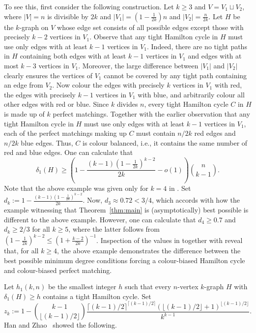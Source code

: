 \documentclass[A4paper,12pt]{article}
\theoremstyle{definition}
\begin{document}
To see this, first consider the following construction. 
Let $k \geq 3$ and $V = V_1 \sqcup V_2$, where $|V| = n$ is divisible by $2k$ and $|V_1| = (1 - \frac{1}{2k})n$ and $|V_2| = \frac{n}{2k}$.
Let $H$ be the $k$-graph on $V$ whose edge set consists of all possible edges except those with precisely $k-2$ vertices in $V_1$. 
Observe that any tight Hamilton cycle in $H$ must use only edges with at least $k-1$ vertices in $V_1$.
Indeed, there are no tight paths in $H$ containing both edges with at least $k-1$ vertices in $V_1$ and edges with at most $k-3$ vertices in $V_1$. 
Moreover, the large difference between $|V_1|$ and $|V_2|$ clearly ensures the vertices of $V_1$ cannot be covered by any tight path containing an edge from $V_2$. 
Now colour the edges with precisely $k$ vertices in $V_1$ with red, the edges with precisely $k-1$ vertices in $V_1$ with blue, and arbitrarily colour all other edges with red or blue. 
Since $k$ divides $n$, every tight Hamilton cycle $C$ in $H$ is made up of $k$ perfect matchings.
Together with the earlier observation that any tight Hamilton cycle in $H$ must use only edges with at least $k-1$ vertices in $V_1$, each of the perfect matchings making up $C$ must contain $n/2k$ red edges and $n/2k$ blue edges.
Thus, $C$ is colour balanced, i.e., it contains the same number of red and blue edges.
One can calculate that $$\delta_1(H) \geq \left(1 - \frac{(k-1)\left(1 - \frac{1}{2k}\right)^{k-2}}{2k} - o(1)\right)\binom{n}{k-1}.$$ 
Note that the above example was given only for $k=4$ in \cite{color-bias25}. Set $d_k := 1 - \frac{(k-1)\left(1 - \frac{1}{2k}\right)^{k-2}}{2k}$. 
Now, $d_3 \approx 0.72 < 3/4$, which accords with how the example witnessing that Theorem~\ref{thm:main} is (asymptotically) best possible is different to the above example.
However, one can calculate that $d_4 \geq 0.7$ and $d_k \geq 2/3$ for all $k \geq 5$, where the latter follows from $(1 - \frac{1}{2k})^{k-2} \leq(1 + \frac{k-2}{2k})^{-1}$.
Inspection of the values in \cite[Table 1]{color-bias25} together with \cite[Theorem~1.3]{color-bias25} reveal that, for all $k\geq 4$, 
the above example demonstrates the difference between the best possible minimum degree conditions forcing a colour-biased Hamilton cycle and colour-biased perfect matching.

Let $h_1(k,n)$ be the smallest integer $h$ such that every $n$-vertex $k$-graph $H$ with $\delta_1(H) \geq h$ contains a tight Hamilton cycle. Set $$z_k := 1 - \binom{k-1}{\lfloor (k-1)/2\rfloor}\frac{\lceil (k-1)/2 \rceil^{\lceil (k-1)/2 \rceil} (\lfloor (k-1)/2 \rfloor + 1)^{\lfloor (k-1)/2 \rfloor}}{k^{k-1}}.$$  Han and Zhao~\cite{hz16} showed the following.
\end{document}
